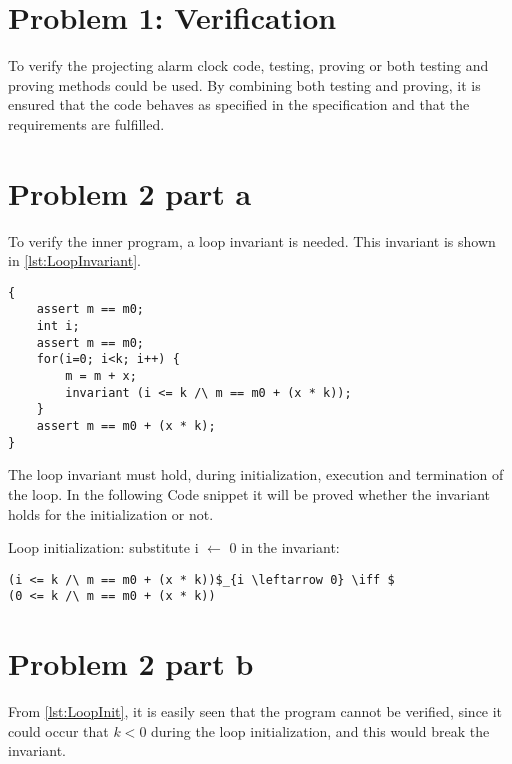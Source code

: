 \documentclass[Main_Assignment4]{subfiles}
\begin{document}
\section{Problem 1: Verification}
To verify the projecting alarm clock code, testing, proving or both testing and proving methods could be used. 
By combining both testing and proving, it is ensured that the code behaves as specified in the specification and that the requirements are fulfilled.

\section{Problem 2 part a}
To verify the inner program, a loop invariant is needed. 
This invariant is shown in \codeTitle \ref{lst:LoopInvariant}. 

\begin{lstlisting}[mathescape, caption=Loop invariant, style=Code-C++, label=lst:LoopInvariant]
{
	assert m == m0;
	int i;
	assert m == m0;
	for(i=0; i<k; i++) {
		m = m + x;
		invariant (i <= k /\ m == m0 + (x * k));
	}
	assert m == m0 + (x * k);
}
\end{lstlisting}

The loop invariant must hold, during initialization, execution and termination of the loop. In the following Code snippet it will be proved whether the invariant holds for the initialization or not.


Loop initialization: substitute i $\leftarrow$ 0 in the invariant:
\begin{lstlisting}[mathescape, caption=Loop initialization, style=Code-C++, label=lst:LoopInit]
(i <= k /\ m == m0 + (x * k))$_{i \leftarrow 0} \iff $ 
(0 <= k /\ m == m0 + (x * k))  
\end{lstlisting}

\section{Problem 2 part b}
From \codeTitle \ref{lst:LoopInit}, it is easily seen that the program cannot be verified, since it could occur that $k < 0$ during the loop initialization, and this would break the invariant.
\end{document}
